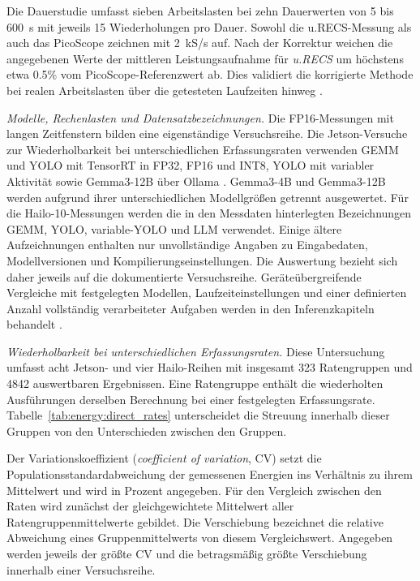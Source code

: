 Die Dauerstudie umfasst sieben Arbeitslasten bei zehn Dauerwerten von 5 bis 600~s mit jeweils 15 Wiederholungen pro Dauer. Sowohl die u.RECS-Messung als auch das PicoScope zeichnen mit 2~kS/s auf. Nach der Korrektur weichen die angegebenen Werte der mittleren Leistungsaufnahme für \textit{u.RECS} um höchstens etwa \num{0.5}\% vom PicoScope-Referenzwert ab. Dies validiert die korrigierte Methode bei realen Arbeitslasten über die getesteten Laufzeiten hinweg \cite[pp.~64--67]{wachsmuth2026masterarbeit}.

\emph{Modelle, Rechenlasten und Datensatzbezeichnungen.} Die FP16-Messungen mit langen Zeitfenstern bilden eine eigenständige Versuchsreihe. Die Jetson-Versuche zur Wiederholbarkeit bei unterschiedlichen Erfassungsraten verwenden GEMM und YOLO mit TensorRT in FP32, FP16 und INT8, YOLO mit variabler Aktivität sowie Gemma3-12B über Ollama \cite{ollama_runtime,mika2026parmaEnergy}. Gemma3-4B und Gemma3-12B werden aufgrund ihrer unterschiedlichen Modellgrößen getrennt ausgewertet. Für die Hailo-10-Messungen werden die in den Messdaten hinterlegten Bezeichnungen GEMM, YOLO, variable-YOLO und LLM verwendet. Einige ältere Aufzeichnungen enthalten nur unvollständige Angaben zu Eingabedaten, Modellversionen und Kompilierungseinstellungen. Die Auswertung bezieht sich daher jeweils auf die dokumentierte Versuchsreihe. Geräteübergreifende Vergleiche mit festgelegten Modellen, Laufzeiteinstellungen und einer definierten Anzahl vollständig verarbeiteter Aufgaben werden in den Inferenzkapiteln behandelt \cite{energyEvidence2026,edgeAIResults2026}.

\emph{Wiederholbarkeit bei unterschiedlichen Erfassungsraten.} Diese Untersuchung umfasst acht Jetson- und vier Hailo-Reihen mit insgesamt 323 Ratengruppen und \num{4842} auswertbaren Ergebnissen. Eine Ratengruppe enthält die wiederholten Ausführungen derselben Berechnung bei einer festgelegten Erfassungsrate. Tabelle~\ref{tab:energy:direct_rates} unterscheidet die Streuung innerhalb dieser Gruppen von den Unterschieden zwischen den Gruppen.

Der Variationskoeffizient (\emph{coefficient of variation}, CV) setzt die Populationsstandardabweichung der gemessenen Energien ins Verhältnis zu ihrem Mittelwert und wird in Prozent angegeben. Für den Vergleich zwischen den Raten wird zunächst der gleichgewichtete Mittelwert aller Ratengruppenmittelwerte gebildet. Die Verschiebung bezeichnet die relative Abweichung eines Gruppenmittelwerts von diesem Vergleichswert. Angegeben werden jeweils der größte CV und die betragsmäßig größte Verschiebung innerhalb einer Versuchsreihe.

